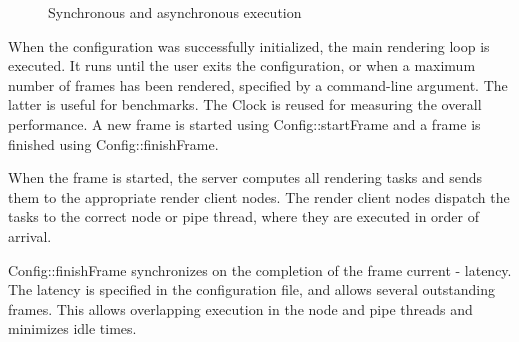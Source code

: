 \documentclass[10pt,a4]{scrartcl}
\begin{document}
\begin{figure}
  \hfil
  {\caption{\small\label{fSyncAsync}Synchronous and asynchronous execution}}
\end{figure}
When the configuration was successfully initialized, the main rendering
loop is executed. It runs until the user exits the
configuration, or when a maximum number of frames has been rendered,
specified by a command-line argument. The latter is useful for
benchmarks. The \textsf{Clock} is reused for measuring the overall
performance. A new frame is started using \textsf{Config::startFrame}
and a frame is finished using \textsf{Config::finishFrame}.

When the frame is started, the server computes all rendering tasks and
sends them to the appropriate render client nodes. The render client
nodes dispatch the tasks to the correct node or pipe thread, where they
are executed in order of arrival.

\textsf{Config::finishFrame} synchronizes on the completion of the frame
\textsf{current - latency}. The latency is specified in the
configuration file, and allows several outstanding frames. This allows
overlapping execution in the node and pipe threads and minimizes idle
times. 
\end{document}
